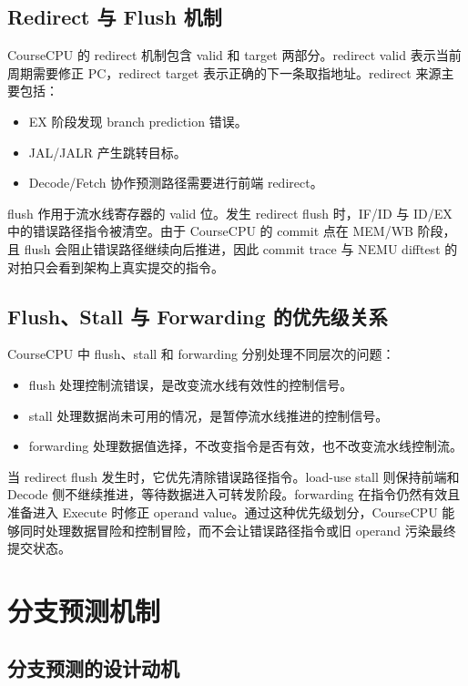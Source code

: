 \documentclass[UTF8,a4paper,12pt]{ctexrep}
\begin{document}
\section{Redirect 与 Flush 机制}

CourseCPU 的 redirect 机制包含 valid 和 target 两部分。redirect valid 表示当前周期需要修正 PC，redirect target 表示正确的下一条取指地址。redirect 来源主要包括：

\begin{itemize}
  \item EX 阶段发现 branch prediction 错误。
  \item JAL/JALR 产生跳转目标。
  \item Decode/Fetch 协作预测路径需要进行前端 redirect。
\end{itemize}

flush 作用于流水线寄存器的 valid 位。发生 redirect flush 时，IF/ID 与 ID/EX 中的错误路径指令被清空。由于 CourseCPU 的 commit 点在 MEM/WB 阶段，且 flush 会阻止错误路径继续向后推进，因此 commit trace 与 NEMU difftest 的对拍只会看到架构上真实提交的指令。

\section{Flush、Stall 与 Forwarding 的优先级关系}

CourseCPU 中 flush、stall 和 forwarding 分别处理不同层次的问题：

\begin{itemize}
  \item flush 处理控制流错误，是改变流水线有效性的控制信号。
  \item stall 处理数据尚未可用的情况，是暂停流水线推进的控制信号。
  \item forwarding 处理数据值选择，不改变指令是否有效，也不改变流水线控制流。
\end{itemize}

当 redirect flush 发生时，它优先清除错误路径指令。load-use stall 则保持前端和 Decode 侧不继续推进，等待数据进入可转发阶段。forwarding 在指令仍然有效且准备进入 Execute 时修正 operand value。通过这种优先级划分，CourseCPU 能够同时处理数据冒险和控制冒险，而不会让错误路径指令或旧 operand 污染最终提交状态。

\chapter{分支预测机制}

\section{分支预测的设计动机}
\end{document}
